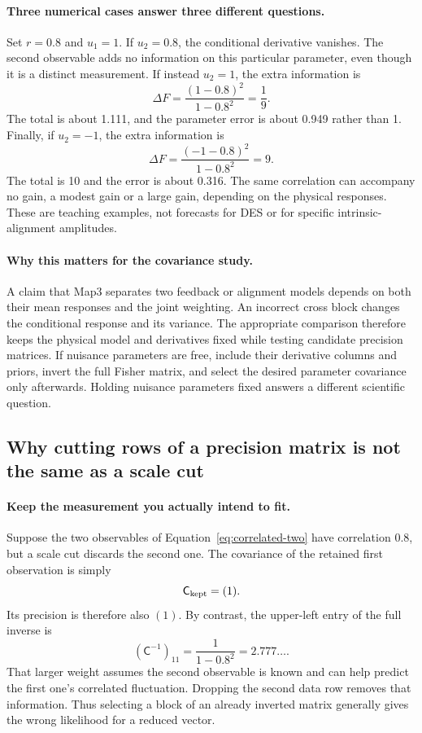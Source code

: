 \documentclass[11pt]{article}
\newcommand{\Cov}{\mathsf{C}}
\begin{document}
\paragraph{Three numerical cases answer three different questions.}
Set $r=0.8$ and $u_1=1$. If $u_2=0.8$, the conditional derivative vanishes.
The second observable adds no information on this particular parameter,
even though it is a distinct measurement. If instead $u_2=1$, the extra
information is
\begin{equation}
 \Delta F=\frac{(1-0.8)^2}{1-0.8^2}=\frac19.
\end{equation}
The total is about 1.111, and the parameter error is about 0.949 rather
than 1. Finally, if $u_2=-1$, the extra information is
\begin{equation}
 \Delta F=\frac{(-1-0.8)^2}{1-0.8^2}=9.
\end{equation}
The total is 10 and the error is about 0.316. The same correlation can
accompany no gain, a modest gain or a large gain, depending on the physical
responses. These are teaching examples, not forecasts for DES or for
specific intrinsic-alignment amplitudes.

\paragraph{Why this matters for the covariance study.}
A claim that Map3 separates two feedback or alignment models depends on
both their mean responses and the joint weighting. An incorrect cross
block changes the conditional response and its variance. The appropriate
comparison therefore keeps the physical model and derivatives fixed while
testing candidate precision matrices. If nuisance parameters are free,
include their derivative columns and priors, invert the full Fisher matrix,
and select the desired parameter covariance only afterwards. Holding
nuisance parameters fixed answers a different scientific question.

\subsection{Why cutting rows of a precision matrix is not the same as a scale cut}
\paragraph{Keep the measurement you actually intend to fit.}
Suppose the two observables of Equation~\eqref{eq:correlated-two} have
correlation 0.8, but a scale cut discards the second one. The covariance
of the retained first observation is simply
\begin{equation}
 \Cov_{\rm kept}=(1).
\end{equation}
Its precision is therefore also $(1)$. By contrast, the upper-left entry
of the full inverse is
\begin{equation}
 (\Cov^{-1})_{11}=\frac1{1-0.8^2}=2.777\ldots.
\end{equation}
That larger weight assumes the second observable is known and can help
predict the first one's correlated fluctuation. Dropping the second data
row removes that information. Thus selecting a block of an already
inverted matrix generally gives the wrong likelihood for a reduced vector.
\end{document}
